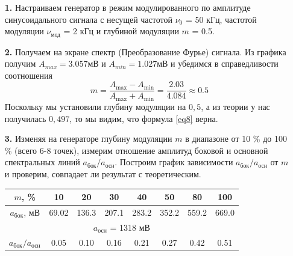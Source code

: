 \documentclass[a4paper,12pt]{article} %
\begin{document}
\begin{enumerate}


	\item [\textbf{1.}] Настраиваем генератор в режим модулированного по амплитуде синусоидального сигнала с несущей частотой $\nu_0$ = 50 кГц, частотой модуляции $\nu_\text{мод}$ = 2 кГц и глубиной модуляции $m$ = 0.5.

	\item [\textbf{2.}] Получаем на экране спектр (Преобразование Фурье) сигнала. Из графика получим $A_{max} = 3.057 \text{мВ}$ и $A_{min} = 1.027 \text{мВ}$ и убедимся в справедливости соотношения $$ m = \frac{A_\text{max} - A_\text{min}}{A_\text{max} + A_\text{min}} = \frac{2.03}{4.084} \approx 0.5 $$
	      Поскольку мы установили глубину модуляции на $0,5$, а из теории у нас получилась $0,497$, то мы видим, что формула \ref{eq8} верна.

	\item [\textbf{3.}]
	      Изменяя на генераторе глубину модуляции $m$ в диапазоне от 10 \% до 100 \% (всего 6-8 точек), измерим отношение амплитуд боковой и основной
	      спектральных линий $a_{\text{бок}}/a_{\text{осн}}$. Построим график зависимости $a_{\text{бок}}/a_{\text{осн}}$ от $m$ и проверим, совпадает ли
	      результат с теоретическим.

	      \begin{center}
		      \begin{tabular}{|c|c|c|c|c|c|c|c|}
			      \hline
			      $m$, \%                         & 10    & 20    & 30    & 40    & 50    & 80    & 100   \\ \hline
			      $a_{\text{бок}}$, мВ            & 69.02 & 136.3 & 207.1 & 283.2 & 352.2 & 559.2 & 669.0 \\ \hline
			      \multicolumn{8}{|c|}{$a_{\text{осн}}$ = 1318 мВ}                                        \\ \hline
			      $a_{\text{бок}}/a_{\text{осн}}$ & 0.05  & 0.10  & 0.16  & 0.21  & 0.27  & 0.42  & 0.51  \\ \hline
		      \end{tabular}


\end{center}
\end{enumerate}
\end{document}
